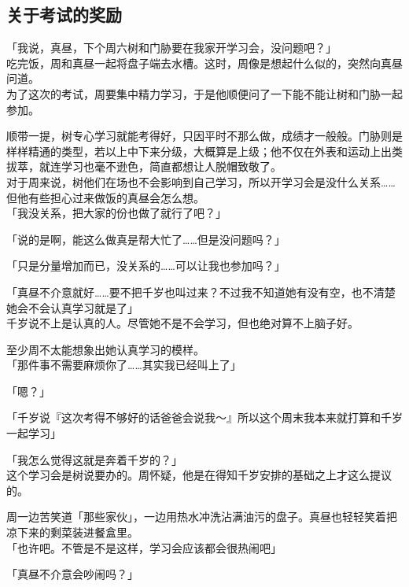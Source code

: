 \subsection{关于考试的奖励}

「我说，真昼，下个周六树和门胁要在我家开学习会，没问题吧？」\\

吃完饭，周和真昼一起将盘子端去水槽。这时，周像是想起什么似的，突然向真昼问道。\\

为了这次的考试，周要集中精力学习，于是他顺便问了一下能不能让树和门胁一起参加。

顺带一提，树专心学习就能考得好，只因平时不那么做，成绩才一般般。门胁则是样样精通的类型，若以上中下来分级，大概算是上级；他不仅在外表和运动上出类拔萃，就连学习也毫不逊色，简直都想让人脱帽致敬了。\\

对于周来说，树他们在场也不会影响到自己学习，所以开学习会是没什么关系……但他有些担心过来做饭的真昼会怎么想。\\

「我没关系，把大家的份也做了就行了吧？」

「说的是啊，能这么做真是帮大忙了……但是没问题吗？」

「只是分量增加而已，没关系的……可以让我也参加吗？」

「真昼不介意就好……要不把千岁也叫过来？不过我不知道她有没有空，也不清楚她会不会认真学习就是了」\\

千岁说不上是认真的人。尽管她不是不会学习，但也绝对算不上脑子好。

至少周不太能想象出她认真学习的模样。\\

「那件事不需要麻烦你了……其实我已经叫上了」

「嗯？」

「千岁说『这次考得不够好的话爸爸会说我～』所以这个周末我本来就打算和千岁一起学习」

「我怎么觉得这就是奔着千岁的？」\\

这个学习会是树说要办的。周怀疑，他是在得知千岁安排的基础之上才这么提议的。

周一边苦笑道「那些家伙」，一边用热水冲洗沾满油污的盘子。真昼也轻轻笑着把凉下来的剩菜装进餐盒里。\\

「也许吧。不管是不是这样，学习会应该都会很热闹吧」

「真昼不介意会吵闹吗？」

